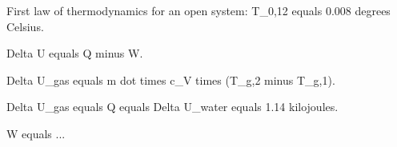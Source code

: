 First law of thermodynamics for an open system: T_0,12 equals 0.008 degrees Celsius.  

Delta U equals Q minus W.  

Delta U_gas equals m dot times c_V times (T_g,2 minus T_g,1).  

Delta U_gas equals Q equals Delta U_water equals 1.14 kilojoules.  

W equals ...